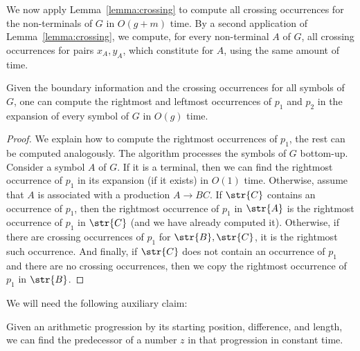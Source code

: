 We now apply Lemma~\ref{lemma:crossing} to compute all crossing occurrences for the non-terminals of $G$ in $O(g+m)$ time. By a second application of Lemma~\ref{lemma:crossing}, we compute, for every non-terminal $A$ of $G$, all crossing occurrences for pairs $x_A,y_A$, which constitute  for $A$, using the same amount of time. 

\begin{proposition}%
Given the boundary information and the crossing occurrences for all symbols of $G$, one can compute the rightmost and leftmost occurrences of $p_1$ and $p_2$ in the expansion of every symbol of $G$ in $O(g)$ time. 
\end{proposition}
\begin{proof}
We explain how to compute the rightmost occurrences of $p_1$, the rest can be computed analogously. The algorithm processes the symbols of $G$ bottom-up. Consider a symbol $A$ of $G$. If it is a terminal, then we can find the rightmost occurrence of $p_1$ in its expansion (if it exists) in $O(1)$ time. Otherwise, assume that $A$ is associated with a production $A \rightarrow BC$. If $\str{C}$ contains an occurrence of $p_1$, then the rightmost occurrence of $p_1$ in $\str{A}$ is the rightmost occurrence of $p_1$ in $\str{C}$ (and we have already computed it). Otherwise, if there are crossing occurrences of $p_1$ for $\str{B}, \str{C}$, it is the rightmost such occurrence. And finally, if $\str{C}$ does not contain an occurrence of $p_1$ and there are no crossing occurrences, then we copy the rightmost occurrence of $p_1$ in $\str{B}$. 

\end{proof} 

We will need the following auxiliary claim:

\begin{observation}\label{obs:arithmetic_predecessor}
Given an arithmetic progression by its starting position, difference, and  length, we can find the predecessor of a number $z$ in that progression in constant time.
\end{observation}
    
